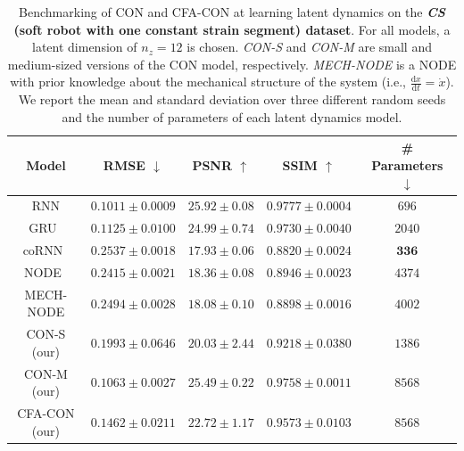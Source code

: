 \begin{table}[ht]
    \centering
    \begin{small}
    \begin{tabular}{c c c c c}
         \toprule
         \textbf{Model} & \textbf{RMSE} $\downarrow$ & \textbf{PSNR} $\uparrow$ & \textbf{SSIM} $\uparrow$ & \textbf{\# Parameters} $\downarrow$ \\
         \midrule
         RNN & $\mathbf{0.1011 \pm 0.0009}$ & $\mathbf{25.92 \pm 0.08}$ & $\mathbf{0.9777 \pm 0.0004}$ & $696$\\
         GRU~\citep{cho2014learning} & $0.1125 \pm 0.0100$ & $24.99 \pm 0.74$ & $0.9730 \pm 0.0040$ & $2040$\\
         coRNN~\citep{rusch2020coupled} & $0.2537 \pm 0.0018$ & $17.93 \pm 0.06$ & $0.8820 \pm 0.0024$ & $\mathbf{336}$\\
         NODE~\citep{chen2018neural} & $0.2415 \pm 0.0021$ & $18.36 \pm 0.08$ & $0.8946 \pm 0.0023$ & $4374$\\
         MECH-NODE & $0.2494 \pm 0.0028$ & $18.08 \pm 0.10$ & $0.8898 \pm 0.0016$ & $4002$\\
         CON-S (our) & $0.1993 \pm 0.0646$ & $20.03 \pm 2.44$ & $0.9218 \pm 0.0380$ & $1386$\\
         CON-M (our) & $0.1063 \pm 0.0027$ & $25.49 \pm 0.22$ & $0.9758 \pm 0.0011$ & $8568$\\
         CFA-CON (our) & $0.1462 \pm 0.0211$ & $22.72 \pm 1.17$ & $0.9573 \pm 0.0103$ & $8568$\\
         \bottomrule
    \end{tabular}
    \end{small}
    \vspace{0.5cm}
    \caption{Benchmarking of \gls{CON} and \gls{CFA-CON} at learning latent dynamics on the \textbf{\emph{CS} (soft robot with one constant strain segment) dataset}. For all models, a latent dimension of $n_z=12$ is chosen. \emph{CON-S} and \emph{CON-M} are small and medium-sized versions of the \gls{CON} model, respectively. \emph{MECH-NODE} is a \gls{NODE} with prior knowledge about the mechanical structure of the system (i.e., $\frac{\mathrm{d}x}{\mathrm{d}t} = \dot{x}$). We report the mean and standard deviation over three different random seeds and the number of parameters of each latent dynamics model.
}
    \label{tab:apx-con:latent_dynamics_results:cs}
\end{table}

